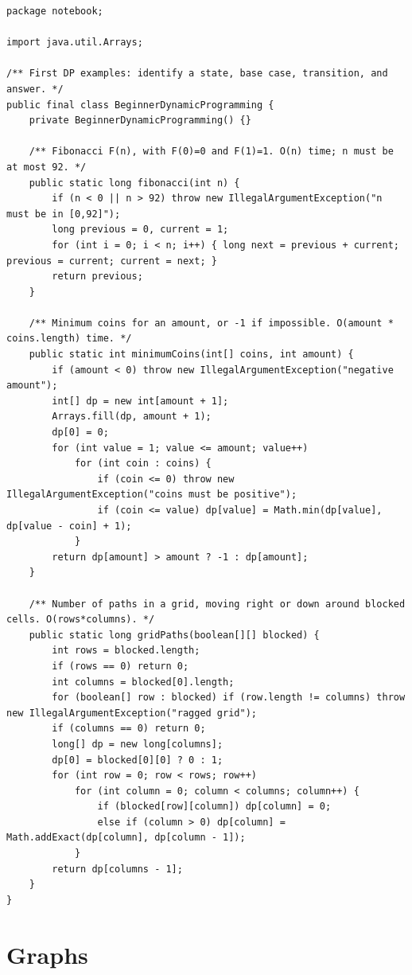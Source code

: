 \documentclass[10pt,letterpaper]{article}
\begin{document}
\begin{lstlisting}
package notebook;

import java.util.Arrays;

/** First DP examples: identify a state, base case, transition, and answer. */
public final class BeginnerDynamicProgramming {
    private BeginnerDynamicProgramming() {}

    /** Fibonacci F(n), with F(0)=0 and F(1)=1. O(n) time; n must be at most 92. */
    public static long fibonacci(int n) {
        if (n < 0 || n > 92) throw new IllegalArgumentException("n must be in [0,92]");
        long previous = 0, current = 1;
        for (int i = 0; i < n; i++) { long next = previous + current; previous = current; current = next; }
        return previous;
    }

    /** Minimum coins for an amount, or -1 if impossible. O(amount * coins.length) time. */
    public static int minimumCoins(int[] coins, int amount) {
        if (amount < 0) throw new IllegalArgumentException("negative amount");
        int[] dp = new int[amount + 1];
        Arrays.fill(dp, amount + 1);
        dp[0] = 0;
        for (int value = 1; value <= amount; value++)
            for (int coin : coins) {
                if (coin <= 0) throw new IllegalArgumentException("coins must be positive");
                if (coin <= value) dp[value] = Math.min(dp[value], dp[value - coin] + 1);
            }
        return dp[amount] > amount ? -1 : dp[amount];
    }

    /** Number of paths in a grid, moving right or down around blocked cells. O(rows*columns). */
    public static long gridPaths(boolean[][] blocked) {
        int rows = blocked.length;
        if (rows == 0) return 0;
        int columns = blocked[0].length;
        for (boolean[] row : blocked) if (row.length != columns) throw new IllegalArgumentException("ragged grid");
        if (columns == 0) return 0;
        long[] dp = new long[columns];
        dp[0] = blocked[0][0] ? 0 : 1;
        for (int row = 0; row < rows; row++)
            for (int column = 0; column < columns; column++) {
                if (blocked[row][column]) dp[column] = 0;
                else if (column > 0) dp[column] = Math.addExact(dp[column], dp[column - 1]);
            }
        return dp[columns - 1];
    }
}
\end{lstlisting}
\section{Graphs}
\end{document}
